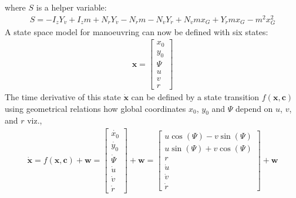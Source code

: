 \documentclass[review]{elsarticle}
\begin{document}
\sphinxAtStartPar
where \(S\) is a helper variable:
\begin{equation}\label{equation:02.01_VMMs:eq_S}
\begin{split}\displaystyle S = - I_{z} Y_{\dot{v}} + I_{z} m + N_{\dot{r}} Y_{\dot{v}} - N_{\dot{r}} m - N_{\dot{v}} Y_{\dot{r}} + N_{\dot{v}} m x_{G} + Y_{\dot{r}} m x_{G} - m^{2} x_{G}^{2}\end{split}
\end{equation}
\sphinxAtStartPar
A state space model for manoeuvring can now be defined with six states:
\begin{equation}\label{equation:02.01_VMMs:eq_x}
\begin{split}\displaystyle \mathbf{x} = \left[\begin{matrix}x_{0}\\y_{0}\\\Psi\\u\\v\\r\end{matrix}\right]\end{split}
\end{equation}
\sphinxAtStartPar
The time derivative of this state \(\dot{\mathbf{x}}\) can be defined by a state transition \(f(\mathbf{x},\mathbf{c})\) using geometrical relations
how global coordinates \(x_0\), \(y_0\) and \(\Psi\) depend on \(u\), \(v\), and \(r\) viz.,
\begin{equation}\label{equation:02.01_VMMs:eqf}
\begin{split}\displaystyle \dot{\mathbf{x}} = f(\mathbf{x},\mathbf{c}) + \mathbf{w}
                                          = \left[\begin{matrix}\dot{x_0}\\ \dot{y_0} \\ \dot{\Psi} \\\dot{u}\\\dot{v}\\\dot{r}\end{matrix}\right] + \mathbf{w}
                                          = \left[\begin{matrix}u \cos{\left(\Psi \right)} - v \sin{\left(\Psi \right)}\\u \sin{\left(\Psi \right)} + v \cos{\left(\Psi \right)}\\r\\\dot{u}\\\dot{v}\\\dot{r}\end{matrix}\right] + \mathbf{w}\end{split}
\end{equation}
\end{document}
